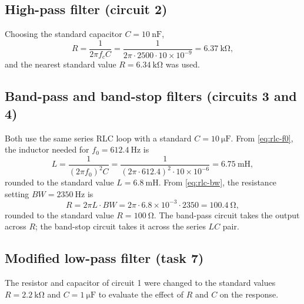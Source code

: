 \documentclass[12pt,a4paper]{article}
\begin{document}
	\subsection{High-pass filter (circuit 2)}
	Choosing the standard capacitor $C = \SI{10}{\nano\farad}$,
	\[
	R = \frac{1}{2\pi f_{c} C}
	= \frac{1}{2\pi \cdot 2500 \cdot 10\times 10^{-9}}
	= \SI{6.37}{\kilo\ohm},
	\]
	and the nearest standard value $R = \SI{6.34}{\kilo\ohm}$ was used.
	
	\subsection{Band-pass and band-stop filters (circuits 3 and 4)}
	Both use the same series RLC loop with a standard
	$C = \SI{10}{\micro\farad}$. From \eqref{eq:rlc-f0}, the inductor needed
	for $f_0 = \SI{612.4}{\hertz}$ is
	\[
	L = \frac{1}{(2\pi f_{0})^{2} C}
	= \frac{1}{(2\pi \cdot 612.4)^{2} \cdot 10\times 10^{-6}}
	= \SI{6.75}{\milli\henry},
	\]
	rounded to the standard value $L = \SI{6.8}{\milli\henry}$. From
	\eqref{eq:rlc-bw}, the resistance setting $BW = \SI{2350}{\hertz}$ is
	\[
	R = 2\pi L \cdot BW = 2\pi \cdot 6.8\times 10^{-3} \cdot 2350
	= \SI{100.4}{\ohm},
	\]
	rounded to the standard value $R = \SI{100}{\ohm}$. The band-pass
	circuit takes the output across $R$; the band-stop circuit takes it
	across the series $LC$ pair.
	
	\subsection{Modified low-pass filter (task 7)}
	The resistor and capacitor of circuit 1 were changed to the standard
	values $R = \SI{2.2}{\kilo\ohm}$ and $C = \SI{1}{\micro\farad}$ to
	evaluate the effect of $R$ and $C$ on the response.
	
\end{document}
